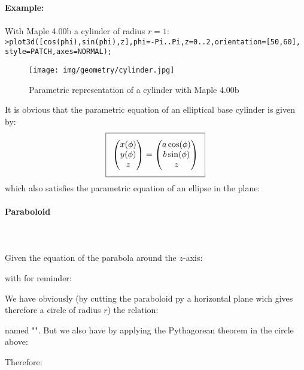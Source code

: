 {	\begin{tcolorbox}[colframe=black,colback=white,sharp corners]
	\textbf{{\Large {}}Example:}\\\\
	With Maple 4.00b a cylinder of radius $r=1$:\\

	\texttt{>plot3d([cos(phi),sin(phi),z],phi=-Pi..Pi,z=0..2,orientation=[50,60],\\
	style=PATCH,axes=NORMAL);
	}
	\begin{figure}[H]
		\centering
		\texttt{[image: img/geometry/cylinder.jpg]}
		\caption{Parametric representation of a cylinder with Maple 4.00b}
	\end{figure}
	\end{tcolorbox}
	It is obvious that the parametric equation of an elliptical base cylinder is given by:
	\begin{equation}
	  \addtolength{\fboxsep}{5pt}
	   \boxed{
	   \begin{gathered}
	   		\begin{pmatrix}
	   		x(\phi)\\y(\phi)\\z
	   		\end{pmatrix}=
	   		\begin{pmatrix}
	   		a\cos(\phi)\\b\sin(\phi)\\z
	   		\end{pmatrix}
	   \end{gathered}
	   }
	\end{equation}
	which also satisfies the parametric equation of an ellipse in the plane:
	
	
	\pagebreak
	\paragraph{Paraboloid}\mbox{}\\\\
	Given the equation of the parabola around the $z$-axis:
	
	with for reminder:
	
	We have obviously (by cutting the paraboloid py a horizontal plane wich gives therefore a circle of radius $r$) the relation:
	
	named "". But we also have by applying the Pythagorean theorem in the circle above:
	
	Therefore:
	
}
